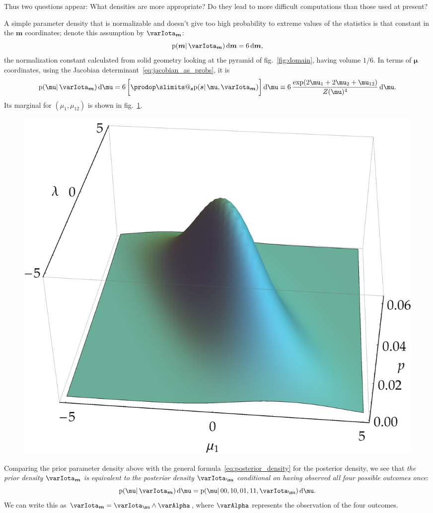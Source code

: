 \documentclass[\ifafour a4paper,12pt,\else a5paper,10pt,\fi%
onecolumn,oneside,article,%
british%
]{memoir}
\makeatletter
\theoremstyle{remark}
\theoremstyle{innote}
\def\prod{\DOTSI\prodop\slimits@}
\newcommand*{\di}{\mathrm{d}}%
\newcommand*{\pf}{\mathrm{p}}%
\renewcommand*{\|}{\mathpunct{|}}
\newcommand*{\fig}{fig.}%
\newcommand*{\yI}{\varIota}
\newcommand*{\ys}{\bm{s}}
\newcommand*{\yA}{\varAlpha}
\newcommand*{\la}{\mu_{12}}
\newcommand*{\yth}{\bm{\mu}}
\newcommand*{\yt}{\bm{m}}
\newcommand*{\yIth}{\yI_{\yth}}
\newcommand*{\yIt}{\yI_{\yt}}
\makeatother
\begin{document}
Thus two questions appear: What densities are more appropriate? Do they
lead to more difficult computations than those used at present?

\bigskip

A simple parameter density that is normalizable and doesn't give too high
probability to extreme values of the statistics is that constant in the
$\yt$ coordinates; denote this assumption by $\yIt$:
\begin{equation}
  \label{eq:density_constant_statistics}
  \pf(\yt \| \yIt)\,\di\yt = 6\, \di\yt,
\end{equation}
the normalization constant calculated from solid geometry looking at the
pyramid of \fig~\ref{fig:domain}, having volume $1/6$. In terms of $\yth$
coordinates, using the Jacobian determinant~\eqref{eq:jacobian_as_probs},
it is
\begin{equation}
  \label{eq:density_constant_statistics_first_coords}
  \pf(\yth \|\yIt)\,\di\yth =
  6\,\biggl[ \prod_{\ys}\pf(\ys \|\yth,\yIt) \biggr]\,\di\yth
  \equiv
6\,  \frac{\exp(2\mu_1 + 2\mu_2 + \la)}{Z(\yth)^4}\,\di\yth.
\end{equation}
Its marginal for $(\mu_1,\la)$ is shown in
\fig~\ref{fig:marginal_flatstat}.
\begin{figure}[t!]%
  \centering\includegraphics[width=0.75\linewidth]{marginal_flatstat.png}\\
  \caption{}
  \label{fig:marginal_flatstat}
\end{figure}%

Comparing the prior parameter density above with the general
formula~\eqref{eq:posterior_density} for the posterior density, we see that
\emph{the prior density $\yIt$  is equivalent to the posterior density
  $\yIth$ conditional on having observed all four possible outcomes once}:
\begin{equation}
  \label{eq:equivalence_prior_postdata}
  \pf(\yth \|\yIt)\,\di\yth =
\pf(\yth \| 00,10,01,11,\yIth)\,\di\yth.
\end{equation}
We can write this as $\yIt = \yIth \land \yA$, where $\yA$ represents the
observation of the four outcomes.
\end{document}
